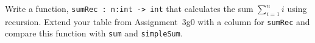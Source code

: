 Write a function, \lstinline{sumRec : n:int -> int} that calculates the sum $\sum_{i=1}^ni$ using recursion. Extend your table from Assignment~3g0 with a column for \lstinline{sumRec} and compare this function with \lstinline{sum} and \lstinline{simpleSum}.
